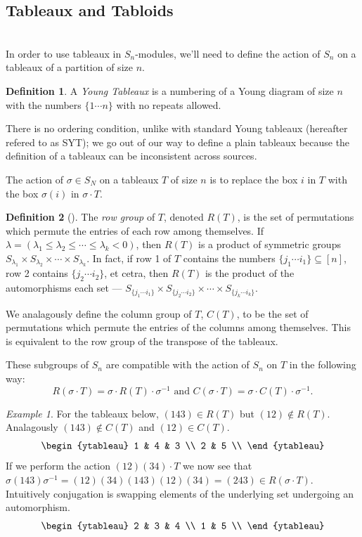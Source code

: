 \documentclass[12pt,twoside]{reedthesis}
\theoremstyle{plain}   %
\theoremstyle{definition}
\newtheorem{defn}{Definition}[section]
\theoremstyle{remark}
\newtheorem{ex}{Example}[section]
\numberwithin{equation}{section}
\begin{document}
   \subsection{Tableaux and Tabloids} \hfill\\
   In order to use tableaux in $S_n$-modules, we'll need to define the action of $S_n$ on a tableaux of a partition of size $n$.
   \begin{defn}
     A \emph{Young Tableaux} is a numbering of a Young diagram of size $n$ with the numbers $\{1 \cdots n\}$ with no
     repeats allowed. \par
     There is no ordering condition, unlike with standard Young tableaux (hereafter refered to as SYT);
     we go out of our way to define a plain tableaux because the definition of a tableaux can be inconsistent across sources.
   \end{defn}
   The action of $\sigma \in S_N$ on a tableaux $T$ of size $n$ is to replace the box $i$ in $T$ with the box $\sigma(i)$ in $\sigma \cdot T$.
   \begin{defn}[{\cite[Pg. 84]{fulton}}]
     The \emph{row group} of $T$, denoted $R(T)$, is the set of permutations which permute the entries of each row among themselves.
     If $\lambda = ( \lambda_1 \leq \lambda_2 \leq \cdots \leq \lambda_k < 0)$, then $R(T)$ is a product of symmetric groups
     $S_{\lambda_1} \times S_{\lambda_2} \times \cdots \times S_{\lambda_k}$.
     In fact, if row 1 of $T$ contains the numbers $\{ j_1 \cdots i_1\} \subseteq [n]$, row 2 contains $\{j_2 \cdots i_2 \}$, et cetra,
     then $R(T)$ is the product of the automorphisms each set --- $S_{\{ j_1 \cdots i_1\}} \times S_{\{ j_2 \cdots i_2\}} \times \cdots \times S_{\{ j_k \cdots i_k\}}$.\par
     We analagously define the column group of $T$, $C(T)$, to be the set of permutations which permute the entries of the columns among themselves.
     This is equivalent to the row group of the transpose of the tableaux.
   \end{defn}
   These subgroups of $S_n$ are compatible with the action of $S_n$ on $T$ in the following way:
   \[ R(\sigma \cdot T) = \sigma \cdot R(T) \cdot \sigma^{-1} \text{ and } C(\sigma \cdot T) = \sigma \cdot C(T) \cdot \sigma^{-1}.\]
   \begin{ex}
     For the tableaux below,
     $(143) \in R(T)$ but $(12) \notin R(T)$.
     Analagously $(143) \notin C(T)$ and $(12) \in C(T)$.
     \[
       \begin{ytableau}
         1 & 4 & 3 \\
         2 & 5 \\
       \end{ytableau}
     \]
     If we perform the action $(12)(34) \cdot T$ we now see that $\sigma (143) \sigma^{-1} = (12)(34) (143) (12)(34) = (243) \in R(\sigma \cdot T)$.
     Intuitively conjugation is swapping elements of the underlying set undergoing an automorphism.
     \[
       \begin{ytableau}
         2 & 3 & 4 \\
         1 & 5 \\
       \end{ytableau}
     \]
   \end{ex}
\end{document}
